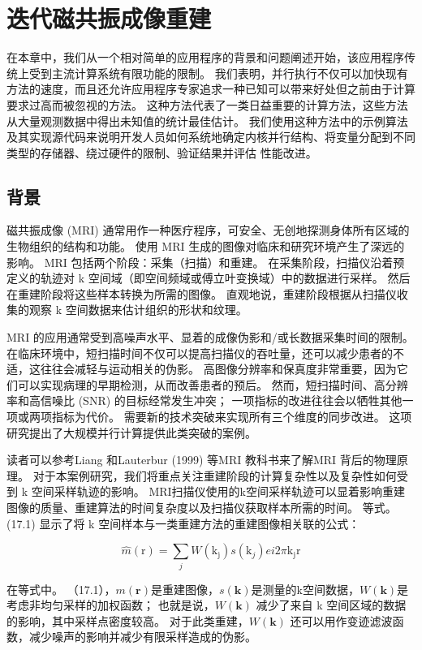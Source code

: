 \section{迭代磁共振成像重建}
在本章中，我们从一个相对简单的应用程序的背景和问题阐述开始，该应用程序传统上受到主流计算系统有限功能的限制。 我们表明，并行执行不仅可以加快现有方法的速度，而且还允许应用程序专家追求一种已知可以带来好处但之前由于计算要求过高而被忽视的方法。 这种方法代表了一类日益重要的计算方法，这些方法从大量观测数据中得出未知值的统计最佳估计。 我们使用这种方法中的示例算法及其实现源代码来说明开发人员如何系统地确定内核并行结构、将变量分配到不同类型的存储器、绕过硬件的限制、验证结果并评估 性能改进。

\subsection{背景}
磁共振成像 (MRI) 通常用作一种医疗程序，可安全、无创地探测身体所有区域的生物组织的结构和功能。 使用 MRI 生成的图像对临床和研究环境产生了深远的影响。 MRI 包括两个阶段：采集（扫描）和重建。 在采集阶段，扫描仪沿着预定义的轨迹对 k 空间域（即空间频域或傅立叶变换域）中的数据进行采样。 然后在重建阶段将这些样本转换为所需的图像。 直观地说，重建阶段根据从扫描仪收集的观察 k 空间数据来估计组织的形状和纹理。

MRI 的应用通常受到高噪声水平、显着的成像伪影和/或长数据采集时间的限制。 在临床环境中，短扫描时间不仅可以提高扫描仪的吞吐量，还可以减少患者的不适，这往往会减轻与运动相关的伪影。 高图像分辨率和保真度非常重要，因为它们可以实现病理的早期检测，从而改善患者的预后。 然而，短扫描时间、高分辨率和高信噪比 (SNR) 的目标经常发生冲突； 一项指标的改进往往会以牺牲其他一项或两项指标为代价。 需要新的技术突破来实现所有三个维度的同步改进。 这项研究提出了大规模并行计算提供此类突破的案例。

读者可以参考Liang 和Lauterbur (1999) 等MRI 教科书来了解MRI 背后的物理原理。 对于本案例研究，我们将重点关注重建阶段的计算复杂性以及复杂性如何受到 k 空间采样轨迹的影响。 MRI扫描仪使用的k空间采样轨迹可以显着影响重建图像的质量、重建算法的时间复杂度以及扫描仪获取样本所需的时间。 等式。 (17.1) 显示了将 k 空间样本与一类重建方法的重建图像相关联的公式：

$$
\widehat{m}(\mathrm{r})=\sum_{j} W\left(\mathrm{k}_{\mathrm{j}}\right) s\left(\mathrm{k}_{j }\right) e i 2 \pi \mathrm{k}_{\mathrm{j}} \mathrm{r}
$$

在等式中。 （17.1），$m(\mathbf{r})$是重建图像，$s(\mathbf{k})$是测量的k空间数据，$W(\mathbf{k})$是 考虑非均匀采样的加权函数； 也就是说，$W(\mathbf{k})$ 减少了来自 k 空间区域的数据的影响，其中采样点密度较高。 对于此类重建，$W(\mathbf{k})$ 还可以用作变迹滤波函数，减少噪声的影响并减少有限采样造成的伪影。


